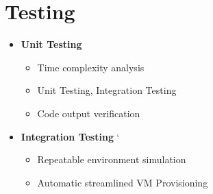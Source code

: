 \section*{\color{NavyBlue}Testing}

\begin{itemize}
\item\Large{\color{Blue}\textbf{Unit Testing}}
    \begin{itemize} %
        \item Time complexity analysis
        \item Unit Testing, Integration Testing
        \item Code output verification
    \end{itemize}
\end{itemize}

\begin{itemize}
\item\Large{\color{Blue}\textbf{Integration Testing}}
`   \begin{itemize}
        \item Repeatable environment simulation
        \item Automatic streamlined VM Provisioning
    \end{itemize}
\end{itemize}

